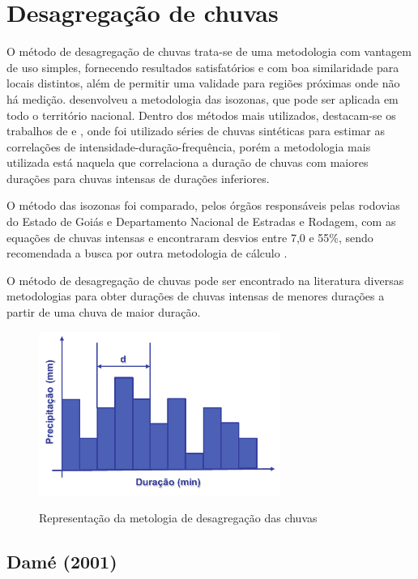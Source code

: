\section{Desagregação de chuvas}

O método de desagregação de chuvas trata-se de uma metodologia com vantagem de uso simples, fornecendo resultados satisfatórios e com boa similaridade para locais distintos, além de permitir uma validade para regiões próximas onde não há medição. \cite{praticas-hidrologicas} desenvolveu a metodologia das isozonas, que pode ser aplicada em todo o território nacional. Dentro dos métodos mais utilizados, destacam-se os trabalhos de  e , onde foi utilizado séries de chuvas sintéticas para estimar as correlações de intensidade-duração-frequência, porém a metodologia mais utilizada está naquela que correlaciona a duração de chuvas com maiores durações para chuvas intensas de durações inferiores.

O método das isozonas foi comparado, pelos órgãos responsáveis pelas rodovias do Estado de Goiás e Departamento Nacional de Estradas e Rodagem, com as equações de chuvas intensas e encontraram desvios entre 7,0 e 55\%, sendo recomendada a busca por outra metodologia de cálculo \cite{isozonas}.

O método de desagregação de chuvas pode ser encontrado na literatura diversas metodologias para obter durações de chuvas intensas de menores durações a partir de uma chuva de maior duração.

\begin{figure}[h]
    \caption{Representação da metologia de desagregação das chuvas}
    \centering
    \includegraphics[width=0.7\textwidth]{Textuais/Figuras/desagregacao.pdf}
    \label{fig:desagregacao}
\end{figure}

\subsection{Damé (2001)}

